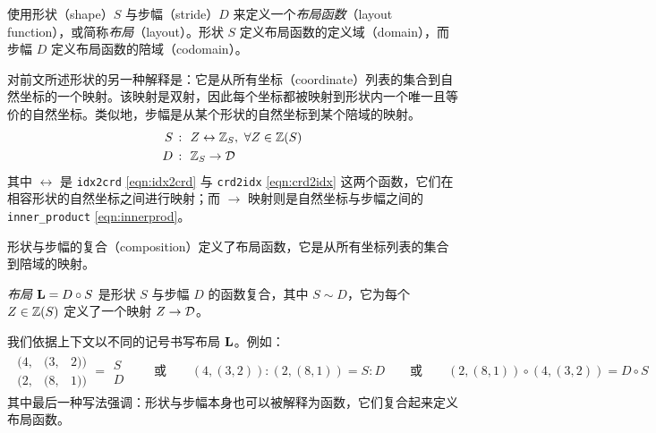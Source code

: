 
\label{sec:layout}

\CuTe 使用形状（shape）$S$ 与步幅（stride）$D$ 来定义一个\emph{布局函数}（layout function），或简称\emph{布局}（layout）。形状 $S$ 定义布局函数的定义域（domain），而步幅 $D$ 定义布局函数的陪域（codomain）。

对前文所述形状的另一种解释是：它是从所有坐标（coordinate）列表的集合到自然坐标的一个映射。该映射是双射，因此每个坐标都被映射到形状内一个唯一且等价的自然坐标。类似地，步幅是从某个形状的自然坐标到某个陪域的映射。
\begin{align*}
S \ &\colon \ Z \leftrightarrow \mathbb{Z}_S, \ \forall Z \in \mathbb{Z}(S) \\
D \ &\colon \ \mathbb{Z}_S \to \mathcal{D}
\end{align*}
其中 $\leftrightarrow$ 是 {\tt idx2crd} \eqref{eqn:idx2crd} 与 {\tt crd2idx} \eqref{eqn:crd2idx} 这两个函数，它们在相容形状的自然坐标之间进行映射；而 $\to$ 映射则是自然坐标与步幅之间的 \texttt{inner\_product} \eqref{eqn:innerprod}。

形状与步幅的复合（composition）定义了布局函数，它是从所有坐标列表的集合到陪域的映射。

\begin{definition}
\emph{布局} $\mathbf{L} = D \circ S$ 是形状 $S$ 与步幅 $D$ 的函数复合，其中 $S \sim D$，它为每个 $Z \in \mathbb{Z}(S)$ 定义了一个映射 $Z \to \mathcal{D}$。
\end{definition}


我们依据上下文以不同的记号书写布局 $\mathbf{L}$。例如：
\begin{align*}
\begin{array}{ccc} (4, & (3, & 2)) \\ (2, & (8, & 1)) \end{array} = \begin{array}{c} S \\ D \end{array} \quad\quad \text{或} \quad\quad (4, (3, 2)) : (2, (8, 1)) = S : D  \quad\quad \text{或} \quad\quad (2, (8, 1)) \circ (4, (3, 2)) = D \circ S
\end{align*}
其中最后一种写法强调：形状与步幅本身也可以被解释为函数，它们复合起来定义布局函数。

